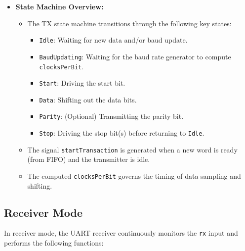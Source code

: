 \begin{itemize}
    \item \textbf{State Machine Overview:}
    \begin{itemize}
        \item The TX state machine transitions through the following key states:
            \begin{itemize}
                \item \texttt{Idle}: Waiting for new data and/or baud update.
                \item \texttt{BaudUpdating}: Waiting for the baud rate generator to compute \texttt{clocksPerBit}.
                \item \texttt{Start}: Driving the start bit.
                \item \texttt{Data}: Shifting out the data bits.
                \item \texttt{Parity}: (Optional) Transmitting the parity bit.
                \item \texttt{Stop}: Driving the stop bit(s) before returning to \texttt{Idle}.
            \end{itemize}
        \item The signal \texttt{startTransaction} is generated when a new word is ready (from FIFO) and the transmitter is idle.
        \item The computed \texttt{clocksPerBit} governs the timing of data sampling and shifting.
    \end{itemize}
\end{itemize}

\subsection{Receiver Mode}

In receiver mode, the UART receiver continuously monitors the \texttt{rx} input and performs the following functions:

